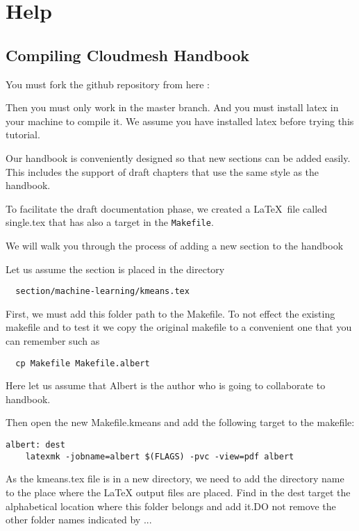 \chapter{Help}

\section{Compiling Cloudmesh Handbook}\label{s:help-compile-handbook}

You must fork the github repository from here :

Then you must only work in the master branch.  And you must install
latex in your machine to compile it. We assume you have installed
latex before trying this tutorial.

Our handbook is conveniently designed so that new sections can be
added easily. This includes the support of draft chapters that use the
same style as the handbook.

To facilitate the draft documentation phase, we created a \LaTeX~file
called single.tex that has also a target in the \verb|Makefile|.

We will walk you through the process of adding a new section to the handbook

Let us assume the section is placed in the directory

\begin{lstlisting}
  section/machine-learning/kmeans.tex 
\end{lstlisting}

First, we must add this folder path to the Makefile. To not effect the
existing makefile and to test it we copy the original makefile to a
convenient one that you can remember such as

\begin{lstlisting}
  cp Makefile Makefile.albert
\end{lstlisting}

Here let us assume that Albert is the author who is going to
collaborate to handbook.

Then open the new Makefile.kmeans and add the following target to the
makefile:

\begin{lstlisting}
albert: dest 
	latexmk -jobname=albert $(FLAGS) -pvc -view=pdf albert
\end{lstlisting}  

As the kmeans.tex file is in a new directory, we need to add the
directory name to the place where the LaTeX output files are placed.
Find in the dest target the alphabetical location where  this folder
belongs and add it.DO not remove the other folder names indicated by
...


